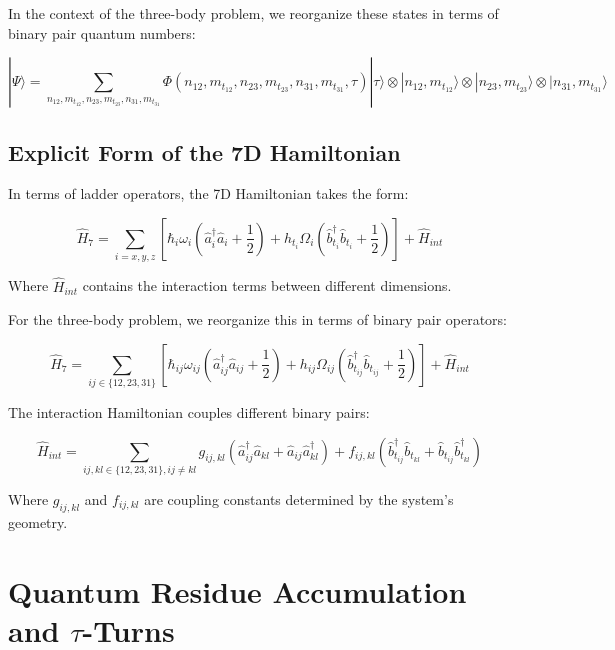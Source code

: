 \documentclass{article}
\begin{document}
In the context of the three-body problem, we reorganize these states in terms of binary pair quantum numbers:

\begin{equation}
|\Psi\rangle = \sum_{n_{12},m_{t_{12}},n_{23},m_{t_{23}},n_{31},m_{t_{31}}} \Phi(n_{12}, m_{t_{12}}, n_{23}, m_{t_{23}}, n_{31}, m_{t_{31}}, \tau) |\tau\rangle \otimes |n_{12}, m_{t_{12}}\rangle \otimes |n_{23}, m_{t_{23}}\rangle \otimes |n_{31}, m_{t_{31}}\rangle
\end{equation}

\subsection{Explicit Form of the 7D Hamiltonian}

In terms of ladder operators, the 7D Hamiltonian takes the form:

\begin{equation}
\hat{H}_7 = \sum_{i=x,y,z} \left[\hbar_i \omega_i (\hat{a}_i^\dagger \hat{a}_i + \frac{1}{2}) + h_{t_i} \Omega_i (\hat{b}_{t_i}^\dagger \hat{b}_{t_i} + \frac{1}{2})\right] + \hat{H}_{int}
\end{equation}

Where $\hat{H}_{int}$ contains the interaction terms between different dimensions.

For the three-body problem, we reorganize this in terms of binary pair operators:

\begin{equation}
\hat{H}_7 = \sum_{ij \in \{12,23,31\}} \left[\hbar_{ij} \omega_{ij} (\hat{a}_{ij}^\dagger \hat{a}_{ij} + \frac{1}{2}) + h_{ij} \Omega_{ij} (\hat{b}_{t_{ij}}^\dagger \hat{b}_{t_{ij}} + \frac{1}{2})\right] + \hat{H}_{int}
\end{equation}

The interaction Hamiltonian couples different binary pairs:

\begin{equation}
\hat{H}_{int} = \sum_{ij,kl \in \{12,23,31\}, ij \neq kl} g_{ij,kl} (\hat{a}_{ij}^\dagger \hat{a}_{kl} + \hat{a}_{ij} \hat{a}_{kl}^\dagger) + f_{ij,kl} (\hat{b}_{t_{ij}}^\dagger \hat{b}_{t_{kl}} + \hat{b}_{t_{ij}} \hat{b}_{t_{kl}}^\dagger)
\end{equation}

Where $g_{ij,kl}$ and $f_{ij,kl}$ are coupling constants determined by the system's geometry.

\section{Quantum Residue Accumulation and $\tau$-Turns}
\end{document}
